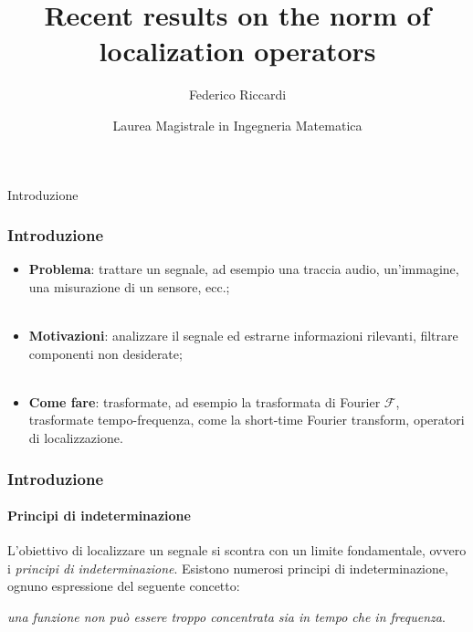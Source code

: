 \documentclass[aspectratio=141]{beamer}
\title[Recent results on the norm of localization operators]{Recent results on the norm of localization operators}
\date[ISPN ’80]{Laurea Magistrale in Ingegneria Matematica}
\author[F. Riccardi]{Federico Riccardi}
\newcommand{\F}{\mathscr{F}} %
\newcommand{\emptyline}{\phantom{ }\\}
\begin{document}
	


\begin{frame}
\titlepage
\end{frame}


\begin{section}{Introduzione}
	
	\begin{frame}
		\frametitle{Introduzione}
		\begin{itemize}
			\item \textbf{Problema}: trattare un segnale, ad esempio una traccia audio, un'immagine, una misurazione di un sensore, ecc.;\\
			\pause
			\emptyline
			\item \textbf{Motivazioni}: analizzare il segnale ed estrarne informazioni rilevanti, filtrare componenti non desiderate;\\
			\pause
			\emptyline
			\item \textbf{Come fare}: trasformate, ad esempio la trasformata di Fourier $\F$, trasformate tempo-frequenza, come la short-time Fourier transform, operatori di localizzazione.
		\end{itemize}
	\end{frame}

	\begin{frame}
		\frametitle{Introduzione}
		\framesubtitle{Principi di indeterminazione}
		L'obiettivo di localizzare un segnale si scontra con un limite fondamentale, ovvero i \emph{principi di indeterminazione}. Esistono numerosi principi di indeterminazione, ognuno espressione del seguente concetto:
		\begin{center}
			\emph{una funzione non può essere troppo concentrata sia in tempo che in frequenza}.
		\end{center}
		\begin{center}
			\begin{figure}
\end{figure}
\end{center}
\end{frame}
\end{section}
\end{document}

